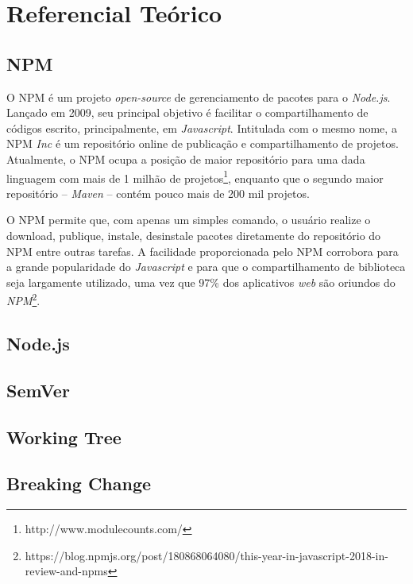 \chapter{Referencial Teórico}
\label{cap:ref-teorico}

\section{\gls{NPM}}
\label{ref-teo:npm}
O \gls{NPM} é um projeto \textit{open-source} de gerenciamento de pacotes para o \textit{Node.js}. Lançado em 2009, seu principal objetivo é facilitar o compartilhamento de códigos escrito, principalmente, em \textit{Javascript}. Intitulada com o mesmo nome, a \gls{NPM} \textit{Inc} é um repositório online de publicação e compartilhamento de projetos. Atualmente, o \gls{NPM} ocupa a posição de maior repositório para uma dada linguagem com mais de 1 milhão de projetos\footnote{http://www.modulecounts.com/}, enquanto que o segundo maior repositório -- \textit{Maven} -- contém pouco mais de 200 mil  projetos.

O \gls{NPM} permite que, com apenas um simples comando, o usuário realize o download, publique, instale, desinstale pacotes diretamente do repositório do \gls{NPM} entre outras tarefas. A facilidade proporcionada pelo \gls{NPM} corrobora para a grande popularidade do \textit{Javascript} e para que o compartilhamento de biblioteca seja largamente utilizado, uma vez que 97\% dos aplicativos \textit{web} são oriundos do \textit{NPM}\footnote{https://blog.npmjs.org/post/180868064080/this-year-in-javascript-2018-in-review-and-npms}.

\section{Node.js}
\label{ref-teo:node}


\section{\gls{SemVer}}
\label{ref-teo:semver}


\section{Working Tree}
\label{ref-teo:working_tree}

\section{Breaking Change}
\label{ref-teo:breaking_change}